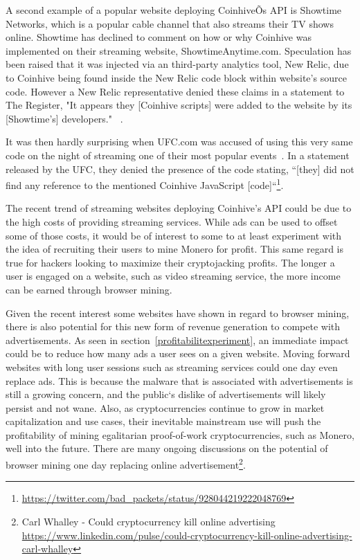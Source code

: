 A second example of a popular website deploying CoinhiveÕs API is Showtime Networks, which is a popular cable channel that also streams their TV shows online. Showtime has declined to comment on how or why Coinhive was implemented on their streaming website, ShowtimeAnytime.com. Speculation has been raised that it was injected via an third-party analytics tool, New Relic, due to Coinhive being found inside the New Relic code block within website's source code. However a New Relic representative denied these claims in a statement to The Register, "It appears they [Coinhive scripts] were added to the website by its [Showtime's] developers." ~\cite{registershowtime}. 

It was then hardly surprising when UFC.com was accused of using this very same code on the night of streaming one of their most popular events~\cite{registerufcmonero}. In a statement released by the UFC, they denied the presence of the code stating, ``[they] did not find any reference to the mentioned Coinhive JavaScript [code]``\footnote{\url{https://twitter.com/bad_packets/status/928044219222048769}}.
 
The recent trend of streaming websites deploying Coinhive's API could be due to the high costs of providing streaming services. While ads can be used to offset some of those costs, it would be of interest to some to at least experiment with the idea of recruiting their users to mine Monero for profit. This same regard is true for hackers looking to maximize their cryptojacking profits. The longer a user is engaged on a website, such as video streaming service, the more income can be earned through browser mining.

Given the recent interest some websites have shown in regard to browser mining, there is also potential for this new form of revenue generation to compete with advertisements. As seen in section~\ref{profitabilitexperiment}, an immediate impact could be to reduce how many ads a user sees on a given website. Moving forward websites with long user sessions such as streaming services could one day even replace ads. This is because the malware that is associated with advertisements is still a growing concern, and the public`s dislike of advertisements will likely persist and not wane. Also, as cryptocurrencies continue to grow in market capitalization and use cases, their inevitable mainstream use will push the profitability of mining egalitarian proof-of-work cryptocurrencies, such as Monero, well into the future. There are many ongoing discussions on the potential of browser mining one day replacing online advertisement\footnote{Carl Whalley - Could cryptocurrency kill online advertising \url{https://www.linkedin.com/pulse/could-cryptocurrency-kill-online-advertising-carl-whalley}}.


